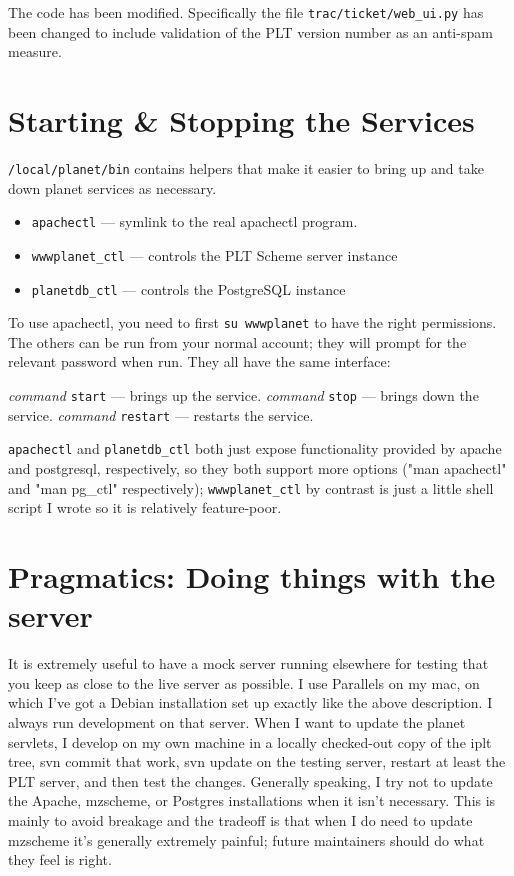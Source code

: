 \documentclass{article}
\begin{document}
The code has been modified. Specifically the file \texttt{trac/ticket/web\_ui.py} has been changed to include validation of the PLT version number as an anti-spam measure.

\section{Starting \& Stopping the Services}

\texttt{/local/planet/bin} contains helpers that make it easier to bring up
and take down planet services as necessary.

\begin{itemize}
\item \texttt{apachectl} --- symlink to the real apachectl program. 
\item \texttt{wwwplanet\_ctl} --- controls the PLT Scheme server instance
\item \texttt{planetdb\_ctl} --- controls the PostgreSQL instance
\end{itemize}

To use apachectl, you need to first \texttt{su wwwplanet} to have the right
permissions. The others can be run from your normal account; they will
prompt for the relevant password when run. They all have the same
interface:

\textit{command} \texttt{start}  --- brings up the service.
\textit{command} \texttt{stop} --- brings down the service.
\textit{command} \texttt{restart} --- restarts the service.

\texttt{apachectl} and \texttt{planetdb\_ctl} both just expose
functionality provided by apache and postgresql, respectively, so they
both support more options ("man apachectl" and "man pg\_ctl"
respectively); \texttt{wwwplanet\_ctl} by contrast is just a little shell script
I wrote so it is relatively feature-poor.

\section{Pragmatics: Doing things with the server}

It is extremely useful to have a mock server running elsewhere for
testing that you keep as close to the live server as possible. I use
Parallels on my mac, on which I've got a Debian installation set up
exactly like the above description. I always run development on that
server. When I want to update the planet servlets, I develop on my own
machine in a locally checked-out copy of the iplt tree, svn commit
that work, svn update on the testing server, restart at least the PLT
server, and then test the changes. Generally speaking, I try not to
update the Apache, mzscheme, or Postgres installations when it isn't
necessary. This is mainly to avoid breakage and the tradeoff is that
when I do need to update mzscheme it's generally extremely painful;
future maintainers should do what they feel is right.
\end{document}
